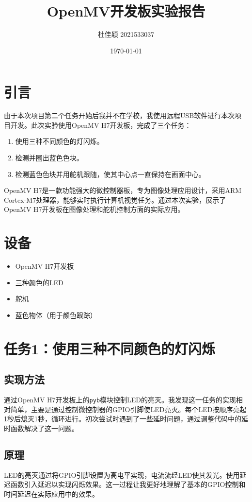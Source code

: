 \documentclass{article}
\title{OpenMV开发板实验报告}
\author{杜佳颖 2021533037}
\date{\today}
\begin{document}
\maketitle

\section{引言}
由于本次项目第二个任务开始后我并不在学校，我使用远程USB软件进行本次项目开发。此次实验使用OpenMV H7开发板，完成了三个任务：
\begin{enumerate}
    \item 使用三种不同颜色的灯闪烁。
    \item 检测并圈出蓝色色块。
    \item 检测蓝色色块并用舵机跟随，使其中心点一直保持在画面中心。
\end{enumerate}

OpenMV H7是一款功能强大的微控制器板，专为图像处理应用设计，采用ARM Cortex-M7处理器，能够实时执行计算机视觉任务。通过本次实验，展示了OpenMV H7开发板在图像处理和舵机控制方面的实际应用。

\section{设备}
\begin{itemize}
    \item OpenMV H7开发板
    \item 三种颜色的LED
    \item 舵机
    \item 蓝色物体（用于颜色跟踪）
\end{itemize}

\section{任务1：使用三种不同颜色的灯闪烁}
\subsection{实现方法}
通过OpenMV H7开发板上的\texttt{pyb}模块控制LED的亮灭。我发现这一任务的实现相对简单，主要是通过控制微控制器的GPIO引脚使LED亮灭。每个LED按顺序亮起1秒后熄灭1秒，循环进行。初次尝试时遇到了一些延时问题，通过调整代码中的延时函数解决了这一问题。

\subsection{原理}
LED的亮灭通过将GPIO引脚设置为高电平实现，电流流经LED使其发光。使用延迟函数引入延迟以实现闪烁效果。这一过程让我更好地理解了基本的GPIO控制和时间延迟在实际应用中的效果。
\end{document}
